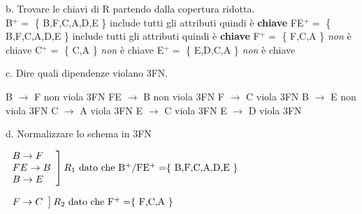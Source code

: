 \documentclass[12pt,a4paper]{article}
\begin{document}
    \noindent
    b. Trovare le chiavi di R partendo dalla copertura ridotta.  \\

    \noindent
    B$^+ =$ \{ B,F,C,A,D,E \} include tutti gli attributi quindi è \textbf{chiave}\newline
    FE$^+ =$ \{ B,F,C,A,D,E \} include tutti gli attributi quindi è \textbf{chiave}\newline
    F$^+ =$ \{ F,C,A \} \emph{non} è chiave \newline
    C$^+ =$ \{ C,A \} \emph{non} è chiave \newline
    E$^+ =$ \{ E,D,C,A \} \emph{non} è chiave \newline

    \noindent
    c. Dire quali dipendenze violano 3FN.  \newline

    \noindent
    B $\rightarrow$ F non viola 3FN \newline
    FE $\rightarrow$ B non viola 3FN  \newline
    F $\rightarrow$ C viola 3FN \newline
    B $\rightarrow$ E non viola 3FN \newline
    C $\rightarrow$ A viola 3FN \newline
    E $\rightarrow$ C viola 3FN \newline
    E $\rightarrow$ D viola 3FN \newline

    \noindent
    d. Normalizzare lo schema in 3FN  \newline

    \( 
    \left.
    \begin{array}{l}
    B \rightarrow F \\
    FE \rightarrow B\\
    B \rightarrow E \\
    \end{array}
    \right] R_1 $ dato che $ $B$^+ $/$ $FE$^+ = $\{ B,F,C,A,D,E \}$ 
    \)
    \newline

    \(
    \left.
    \begin{array}{l}
    F \rightarrow C \\
    \end{array}
    \right] R_2 $ dato che $ $F$^+ = $\{ F,C,A \}$
    \) 
    \newline
    
\end{document}
